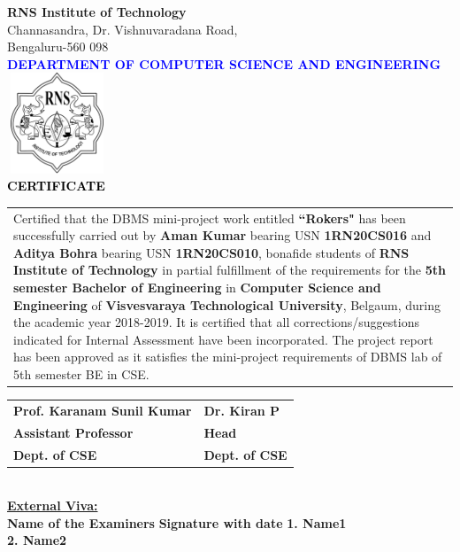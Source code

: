 \thispagestyle{empty}
\begin{center}
\break\break
\textup{\large {\textcolor{darkbrown}{\bf RNS Institute of Technology}} \\ 
{\normalsize{\textcolor{darkbrown}{Channasandra, Dr. Vishnuvaradana Road,\\ Bengaluru-560 098}}}}\\[0.1in]
\textup{\normalsize {\textcolor{blue}{\bf DEPARTMENT OF COMPUTER SCIENCE AND ENGINEERING}}}\\[0.1in]
\includegraphics[width=3cm, height=3cm]{./RNS_logo.png}\\[0.1in]
\textup{\large {\textcolor{black}{\textbf {CERTIFICATE}}}} \\[0.1in]
\end{center}

\justify
\begin{tabular}{p{15cm}}
\hspace{0.4cm} Certified that the DBMS mini-project work entitled \textbf{``Rokers"} has been successfully carried out by \textbf{Aman Kumar} bearing USN \textbf{1RN20CS016} and \textbf{Aditya Bohra} bearing USN \textbf{1RN20CS010}, bonafide students of \textbf{RNS Institute of Technology } in partial fulfillment of the requirements for the \textbf{5th semester Bachelor of Engineering} in \textbf{Computer Science and Engineering} of \textbf{Visvesvaraya Technological University}, Belgaum, during the academic year 2018-2019. It is certified that all corrections/suggestions indicated for Internal Assessment have been incorporated. The project report has been approved as it satisfies the mini-project requirements of DBMS lab of 5th semester BE in CSE.\\[0.4in]
\end{tabular}

\justify
\begin{tabular}{l @{\hfill}  l}
\textbf{Prof. Karanam Sunil Kumar} & \hspace{6cm}\textbf{Dr. Kiran P}\\
\textbf{Assistant Professor} & \hspace{6cm}\textbf{Head}\\
\textbf{Dept. of CSE} & \hspace{6cm}\textbf{Dept. of CSE}\\[0.2in]
\end{tabular}
\\[0.1in]

\justify
\textup{\underline{\textbf{External Viva:}}} \\ 
\textup{\textbf{Name of the Examiners}}\hspace{7.3cm} {\textbf{Signature with date}} 
\justify
\textup{\textbf{1. Name1}} \\[0.2in]
\textup{\textbf{2. Name2}}
\newpage